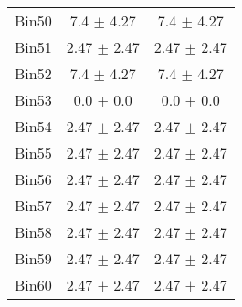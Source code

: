 \begin{tabular}{|c|c|c|}
     Bin50 & 7.4 $\pm$ 4.27 & 7.4 $\pm$ 4.27 \\ \cline{1-3} 
     Bin51 & 2.47 $\pm$ 2.47 & 2.47 $\pm$ 2.47 \\ \cline{1-3} 
     Bin52 & 7.4 $\pm$ 4.27 & 7.4 $\pm$ 4.27 \\ \cline{1-3} 
     Bin53 & 0.0 $\pm$ 0.0 & 0.0 $\pm$ 0.0 \\ \cline{1-3} 
     Bin54 & 2.47 $\pm$ 2.47 & 2.47 $\pm$ 2.47 \\ \cline{1-3} 
     Bin55 & 2.47 $\pm$ 2.47 & 2.47 $\pm$ 2.47 \\ \cline{1-3} 
     Bin56 & 2.47 $\pm$ 2.47 & 2.47 $\pm$ 2.47 \\ \cline{1-3} 
     Bin57 & 2.47 $\pm$ 2.47 & 2.47 $\pm$ 2.47 \\ \cline{1-3} 
     Bin58 & 2.47 $\pm$ 2.47 & 2.47 $\pm$ 2.47 \\ \cline{1-3} 
     Bin59 & 2.47 $\pm$ 2.47 & 2.47 $\pm$ 2.47 \\ \cline{1-3} 
     Bin60 & 2.47 $\pm$ 2.47 & 2.47 $\pm$ 2.47 \\ \cline{1-3} 
  \end{tabular}
